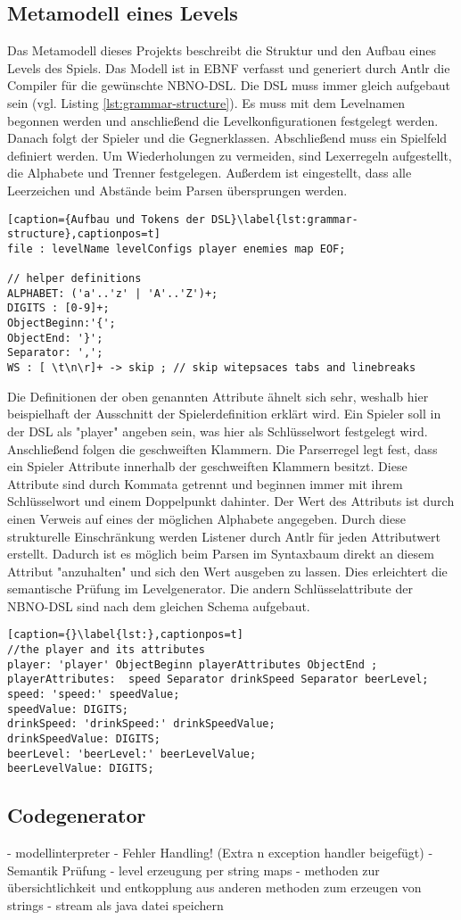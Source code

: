 \subsection{Metamodell eines Levels}
Das Metamodell dieses Projekts beschreibt die Struktur und den Aufbau eines Levels des Spiels. Das Modell ist in EBNF verfasst und generiert durch Antlr die Compiler für die gewünschte NBNO-DSL.\newline
Die DSL muss immer gleich aufgebaut sein (vgl. Listing \ref{lst:grammar-structure}). Es muss mit dem Levelnamen begonnen werden und anschließend die Levelkonfigurationen festgelegt werden. Danach folgt der Spieler und die Gegnerklassen. Abschließend muss ein Spielfeld definiert werden.\newline
Um Wiederholungen zu vermeiden, sind Lexerregeln aufgestellt, die Alphabete und Trenner festgelegen.
Außerdem ist eingestellt, dass alle Leerzeichen und Abstände beim Parsen übersprungen werden.
\begin{lstlisting}[caption={Aufbau und Tokens der DSL}\label{lst:grammar-structure},captionpos=t] 
file : levelName levelConfigs player enemies map EOF;

// helper definitions
ALPHABET: ('a'..'z' | 'A'..'Z')+;
DIGITS : [0-9]+;
ObjectBeginn:'{';
ObjectEnd: '}';
Separator: ',';
WS : [ \t\n\r]+ -> skip ; // skip witepsaces tabs and linebreaks
\end{lstlisting}
 
Die Definitionen der oben genannten Attribute ähnelt sich sehr, weshalb hier beispielhaft der Ausschnitt der Spielerdefinition erklärt wird. Ein Spieler soll in der DSL als "player" angeben sein, was hier als Schlüsselwort festgelegt wird. Anschließend folgen die geschweiften Klammern. Die Parserregel legt fest, dass ein Spieler Attribute innerhalb der geschweiften Klammern besitzt. Diese Attribute sind durch Kommata getrennt und beginnen immer mit ihrem Schlüsselwort und einem Doppelpunkt dahinter. \newline
Der Wert des Attributs ist durch einen Verweis auf eines der möglichen Alphabete angegeben. Durch diese strukturelle Einschränkung werden Listener durch Antlr für jeden Attributwert erstellt. Dadurch ist es möglich beim Parsen im Syntaxbaum direkt an diesem Attribut "anzuhalten" und sich den Wert ausgeben zu lassen. Dies erleichtert die semantische Prüfung im Levelgenerator. Die andern Schlüsselattribute der NBNO-DSL sind nach dem gleichen Schema aufgebaut. 
\begin{lstlisting}[caption={}\label{lst:},captionpos=t] 
//the player and its attributes
player: 'player' ObjectBeginn playerAttributes ObjectEnd ;
playerAttributes:  speed Separator drinkSpeed Separator beerLevel;
speed: 'speed:' speedValue;
speedValue: DIGITS;
drinkSpeed: 'drinkSpeed:' drinkSpeedValue;
drinkSpeedValue: DIGITS;
beerLevel: 'beerLevel:' beerLevelValue;
beerLevelValue: DIGITS;
\end{lstlisting}

\subsection{Codegenerator}
- modellinterpreter
- Fehler Handling! (Extra n exception handler beigefügt)
- Semantik Prüfung
- level erzeugung per string maps 
- methoden zur übersichtlichkeit und entkopplung aus anderen methoden zum erzeugen von strings
- stream als java datei speichern
